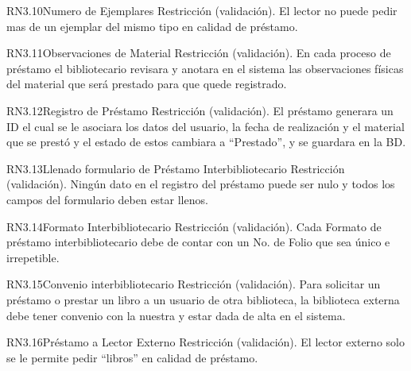 \begin{BussinesRule}{RN3.10}{Numero de Ejemplares} 
	\BRitem[Tipo:] Restricción (validación).
	\BRitem[Descripción:]El lector no puede pedir mas de un ejemplar del mismo tipo en calidad de préstamo.
\end{BussinesRule}

\begin{BussinesRule}{RN3.11}{Observaciones de Material} 
	\BRitem[Tipo:] Restricción (validación).
	\BRitem[Descripción:]En cada proceso de préstamo el bibliotecario revisara y anotara en el sistema las observaciones físicas del material que será prestado para que quede registrado.
\end{BussinesRule}

\begin{BussinesRule}{RN3.12}{Registro de Préstamo} 
	\BRitem[Tipo:] Restricción (validación).
	\BRitem[Descripción:]El préstamo generara un ID el cual se le asociara los datos del usuario, la fecha de realización y el material que se prestó y el estado de estos cambiara a “Prestado”, y se guardara en la BD.
\end{BussinesRule}

\begin{BussinesRule}{RN3.13}{Llenado formulario de Préstamo Interbibliotecario} 
	\BRitem[Tipo:] Restricción (validación).
	\BRitem[Descripción:]Ningún dato en el registro del préstamo puede ser nulo y todos los campos del formulario deben estar llenos.
\end{BussinesRule}

\begin{BussinesRule}{RN3.14}{Formato Interbibliotecario} 
	\BRitem[Tipo:] Restricción (validación).
	\BRitem[Descripción:]Cada Formato de préstamo interbibliotecario debe de contar con un No. de Folio que sea único e irrepetible.
\end{BussinesRule}

\begin{BussinesRule}{RN3.15}{Convenio interbibliotecario} 
	\BRitem[Tipo:] Restricción (validación).
	\BRitem[Descripción:]Para solicitar un préstamo o prestar un libro a un usuario de otra biblioteca, la biblioteca externa debe tener convenio con la nuestra y estar dada de alta en el sistema. 
\end{BussinesRule}

\begin{BussinesRule}{RN3.16}{Préstamo a Lector Externo} 
	\BRitem[Tipo:] Restricción (validación).
	\BRitem[Descripción:]El lector externo solo se le permite pedir “libros” en calidad de préstamo.
\end{BussinesRule}

